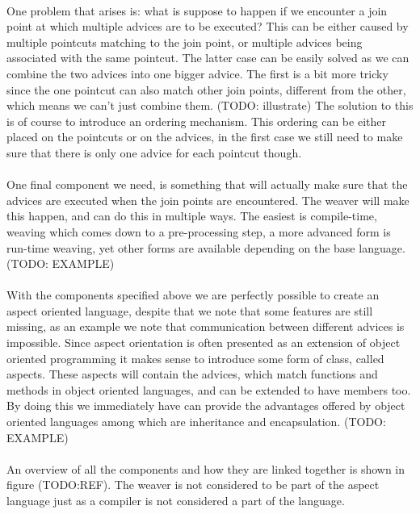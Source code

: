 \documentclass[a4paper]{report}
\begin{document}
\\
One problem that arises is: what is suppose to happen if we encounter a join point at which multiple advices are to be executed? This can be either caused by multiple pointcuts matching to the join point, or multiple advices being associated with the same pointcut. The latter case can be easily solved as we can combine the two advices into one bigger advice. The first is a bit more tricky since the one pointcut can also match other join points, different from the other, which means we can't just combine them. (TODO: illustrate) The solution to this is of course to introduce an ordering mechanism. This ordering can be either placed on the pointcuts or on the advices, in the first case we still need to make sure that there is only one advice for each pointcut though.\\
\\
One final component we need, is something that will actually make sure that the advices are executed when the join points are encountered. The weaver will make this happen, and can do this in multiple ways. The easiest is compile-time, weaving which comes down to a pre-processing step, a more advanced form is run-time weaving, yet other forms are available depending on the base language. (TODO: EXAMPLE)\\
\\
With the components specified above we are perfectly possible to create an aspect oriented language, despite that we note that some features are still missing, as an example we note that communication between different advices is impossible. Since aspect orientation is often presented as an extension of object oriented programming it makes sense to introduce some form of class, called aspects. These aspects will contain the advices, which match functions and methods in object oriented languages, and can be extended to have members too. By doing this we immediately have can provide the advantages offered by object oriented languages among which are inheritance and encapsulation. (TODO: EXAMPLE)\\
\\
An overview of all the components and how they are linked together is shown in figure (TODO:REF). The weaver is not considered to be part of the aspect language just as a compiler is not considered a part of the language.
\end{document}
